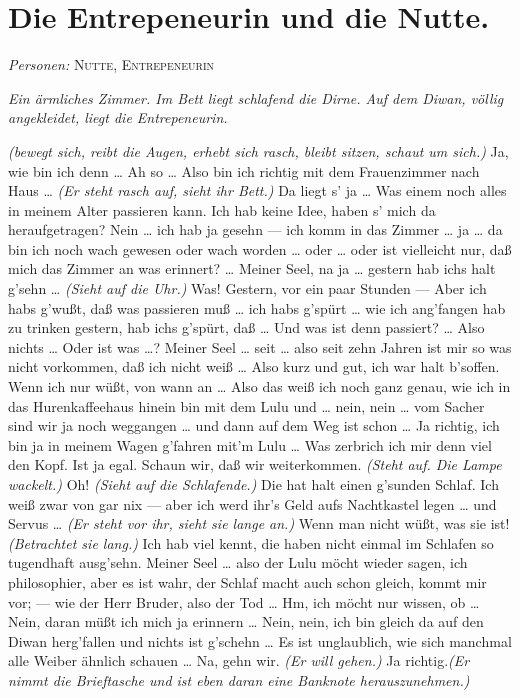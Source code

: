 \documentclass[
	final,
	a4paper,
	ngerman,
	mpinclude = true, %
	twoside = true,
	open = right,
	cleardoublepage = plain,
	DIV = 13,
	BCOR = 1cm,
	titlepage = firstiscover,
	]{scrbook}
\newcommand{\scene}{\section}
\newcommand{\direction}[1]{\textit{(#1)}}
\newcommand{\setting}[1]{\vspace{-0.5\baselineskip}\centering\textit{#1}}
\newcommand{\characterlist}[1]{{\begin{center}\textit{Personen:} #1\end{center}}}
\newcommand{\thecharacter}[1]{\textup{\textsc{#1}}\xspace}
\newcommand{\thedirne}{\thecharacter{Nutte}}
\newcommand{\thegraf}{\thecharacter{Entrepeneurin}}
\newcommand{\character}[1]{\item[#1:]}
\newcommand{\entrepeneurin}{\character{\thegraf}}
\begin{document}
\scene{Die Entrepeneurin und die Nutte.}
\characterlist{\thedirne, \thegraf}
\setting{Ein ärmliches Zimmer. Im Bett liegt schlafend die Dirne. Auf dem Diwan, völlig angekleidet, liegt die Entrepeneurin.}
\begin{play}
	\entrepeneurin
	\direction{bewegt sich, reibt die Augen, erhebt sich rasch, bleibt sitzen, schaut um sich.} Ja, wie bin ich denn \ldots{} Ah so \ldots{} Also bin ich richtig mit dem Frauenzimmer nach Haus \ldots{} \direction{Er steht rasch auf, sieht ihr Bett.} Da liegt s' ja \ldots{} Was einem noch alles in meinem Alter passieren kann. Ich hab keine Idee, haben s' mich da heraufgetragen? Nein \ldots{} ich hab ja gesehn --- ich komm in das Zimmer \ldots{} ja \ldots{} da bin ich noch wach gewesen oder wach worden \ldots{} oder \ldots{} oder ist vielleicht nur, daß mich das Zimmer an was erinnert? \ldots{} Meiner Seel, na ja \ldots{} gestern hab ichs halt g'sehn \ldots{} \direction{Sieht auf die Uhr.} Was! Gestern, vor ein paar Stunden --- Aber ich habs g'wußt, daß was passieren muß \ldots{} ich habs g'spürt \ldots{} wie ich ang'fangen hab zu trinken gestern, hab ichs g'spürt, daß \ldots{} Und was ist denn passiert? \ldots{} Also nichts \ldots{} Oder ist was \ldots{}? Meiner Seel \ldots{} seit \ldots{} also seit zehn Jahren ist mir so was nicht vorkommen, daß ich nicht weiß \ldots{} Also kurz und gut, ich war halt b'soffen. Wenn ich nur wüßt, von wann an \ldots{} Also das weiß ich noch ganz genau, wie ich in das Hurenkaffeehaus hinein bin mit dem Lulu und \ldots{} nein, nein \ldots{} vom Sacher sind wir ja noch weggangen \ldots{} und dann auf dem Weg ist schon \ldots{} Ja richtig, ich bin ja in meinem Wagen g'fahren mit'm Lulu \ldots{} Was zerbrich ich mir denn viel den Kopf. Ist ja egal. Schaun wir, daß wir weiterkommen. \direction{Steht auf. Die Lampe wackelt.} Oh! \direction{Sieht auf die Schlafende.} Die hat halt einen g'sunden Schlaf. Ich weiß zwar von gar nix --- aber ich werd ihr's Geld aufs Nachtkastel legen \ldots{} und Servus \ldots{} \direction{Er steht vor ihr, sieht sie lange an.} Wenn man nicht wüßt, was sie ist! \direction{Betrachtet sie lang.} Ich hab viel kennt, die haben nicht einmal im Schlafen so tugendhaft ausg'sehn. Meiner Seel \ldots{} also der Lulu möcht wieder sagen, ich philosophier, aber es ist wahr, der Schlaf macht auch schon gleich, kommt mir vor; --- wie der Herr Bruder, also der Tod \ldots{} Hm, ich möcht nur wissen, ob \ldots{} Nein, daran müßt ich mich ja erinnern \ldots{} Nein, nein, ich bin gleich da auf den Diwan herg'fallen und nichts ist g'schehn \ldots{} Es ist unglaublich, wie sich manchmal alle Weiber ähnlich schauen \ldots{} Na, gehn wir. \direction{Er will gehen.} Ja richtig.\direction{Er nimmt die Brieftasche und ist eben daran eine Banknote herauszunehmen.}


\end{play}
\end{document}
